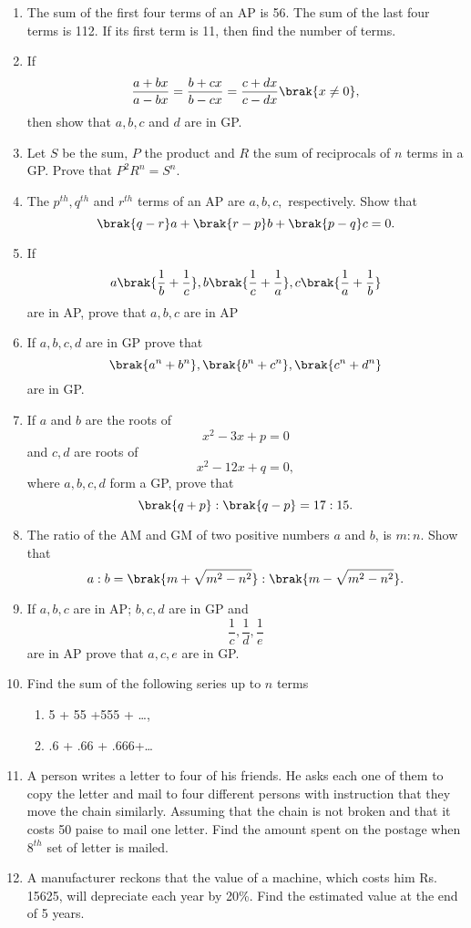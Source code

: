 \begin{enumerate}[label=\thesubsection.\arabic*.,ref=\thesubsection.\theenumi]
\item  The sum of the first four terms of an AP  is 56. The sum of the last four terms is 112. If its first term is 11, then find the number of terms.
\item If $$\frac{a+bx}{a-bx} = \frac{b+cx}{b-cx} = \frac{c+dx}{c-dx}\brak{x \neq 0},$$ then show that $a, b, c$ and $d$ are in GP.
\item Let $S$ be the sum, $P$ the product and $R$ the sum of reciprocals of $n$ terms in a GP.  Prove that $P^2R^n = S^n.$ 
\item The $p^{th}, q^{th}$ and $r^{th}$ terms of an AP  are $a, b, c,$ respectively. Show that 
$$\brak{q - r }a + \brak{r - p }b + \brak{p - q }c = 0.$$
\item If $$a\brak{\frac{1}{b}+\frac{1}{c}}, b\brak{\frac{1}{c}+\frac{1}{a}}, c\brak{\frac{1}{a}+\frac{1}{b}}$$ are in AP, prove that $a, b, c$ are in AP 
\item If $a, b, c, d$ are in GP  prove that $$\brak{a^n + b^n}, \brak{b^n + c^n}, \brak{c^n + d^n}$$ are in GP. 
\item If $a$ and $b$ are the roots of $$x^2 - 3x + p = 0$$ and $c, d$ are roots of $$x^2 - 12x + q = 0,$$ where $a, b, c, d$ form a GP,  prove that $$\brak{q + p} : \brak{q - p} = 17:15.$$
\item The ratio of the AM  and GM  of two positive numbers $a$ and $b$, is $m : n$. Show that 
$$a:b = \brak{m+\sqrt{m^2 - n^2}}:\brak{m - \sqrt{m^2 - n^2}}.$$
\item If $a, b, c$ are in AP; $b, c, d$ are in GP  and $$\frac{1}{c}, \frac{1}{d}, \frac{1}{e}$$ are in AP  prove that $a, c, e$ are in GP.
\item Find the sum of the following series up to $n$ terms
\begin{enumerate}
\item 5 + 55 +555 + \dots, 
\item .6 + .66 + .666+\dots 
\end{enumerate}
\item A person writes a letter to four of his friends. He asks each one of them to copy
the letter and mail to four different persons with instruction that they move the
chain similarly. Assuming that the chain is not broken and that it costs 50 paise to
mail one letter. Find the amount spent on the postage when $8^{th}$ set of letter is
mailed. 
\item A manufacturer reckons that the value of a machine,  which costs him Rs. 15625,  will depreciate each year by 20\%. Find the estimated value at the end of 5 years. 

\end{enumerate}
